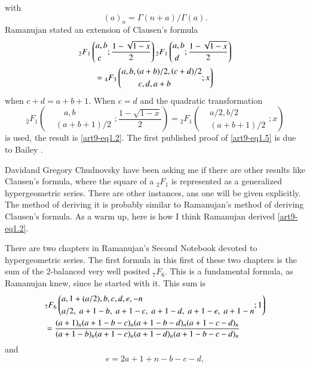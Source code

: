 with 
\begin{equation}
(a)_n = \Gamma (n+a) / \Gamma (a). \label{art1-eq1.4}
\end{equation}
Ramanujan \cite{art1-key11} stated an extension of Clausen's formula
\begin{gather}
{}_2 F_1 \left(
\begin{aligned}
& a, b\\
& ~ c
\end{aligned};
\frac{1 - \sqrt{1-x}}{2} \right) {}_2 F_1 
\left(
\begin{aligned}
& a, b\\
& ~ d
\end{aligned} ; 
\frac{1-\sqrt{1-x}}{2}
 \right) \label{art1-eq1.5}\\
= {}_4 F_3 
\left(
\begin{aligned}
&a, b, (a+b) / 2, (c+ d) / 2\\
& \qquad c, d, a + b
\end{aligned};x \right)
\notag
\end{gather}
when $c+ d = a+ b +1$. When $c =d$ and the quadratic transformation
$$
{}_2 F_1 \left(
\begin{aligned}
& \quad a, b\\
& (a+b+1)/2 
\end{aligned}; \frac{1-\sqrt{1-x}}{2}
 \right) = {}_2 F_1 
\left(
\begin{aligned}
& a/2, b/2\\
& (a+b+1)/2
\end{aligned}; x
\right)
$$
is used, the result is \eqref{art9-eq1.2}. The first published proof of \eqref{art9-eq1.5} is due to Bailey \cite{art1-key1}.

David\pageoriginale and Gregory Chudnovsky have been asking me if there are other results like Clausen's formula, where the square of a ${}_2 F_1$ is represented as a generalized hypergeometric series. There are other instances, ans one will be given explicitly. The method of deriving it is probably similar to Ramanujan's method of deriving Clausen's formula. As a warm up, here is how I think Ramanujan derived \eqref{art9-eq1.2}.

There are two chapters in Ramanujan's Second Notebook devoted to hypergeometric series. The first formula in this first of these two chapters is the sum of the 2-balanced very well posited ${}_7 F_6$. This is a fundamental formula, as Ramanujan knew, since he started with it. This sum is
\begin{align}
& {}_7 F_6 \left(
\begin{aligned}
& a, 1 + (a/2), b, c, d, e, -n\\
& a/2, \;a+1-b, \;a+1-c, \;a+1-d, \;a+1-e, \;a + 1 -n
\end{aligned};1
\right) \label{art1-eq1.6}\\
& =
\frac{(a+1)_n (a+1-b-c)_n (a+1-b-d)_n(a+1-c-d)_n}{(a+1-b)_n (a+1-c)_n (a+1-d)_n (a+1-b-c-d)_n} \notag
\end{align}
and
\begin{equation}
e = 2 a + 1 + n - b - c -d ,  \label{art1-eq1.7}
\end{equation}

